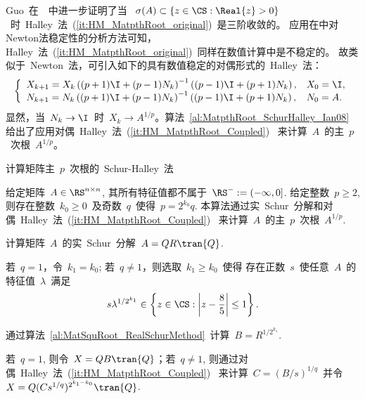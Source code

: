 Guo~在~\cite{Guo2010}~中进一步证明了当 ~$\sigma(A) \subset \{z\in
\CS:
\Real{z}>0\}$~时~Halley~法~(\ref{it:HM_MatpthRoot_original})~是三阶收敛的。
应用在\cite{Iannazzo2006}中对Newton法稳定性的分析方法可知，
Halley~法~(\ref{it:HM_MatpthRoot_original})~同样在数值计算中是不稳定的。
故类似于~Newton~法，可引入如下的具有数值稳定的对偶形式的~Halley~法：
\begin{equation}
\label{it:HM_MatpthRoot_Coupled} \left\{
\begin{array}{ll}
\displaystyle X_{k+1} = X_k\left((p+1)\I + (p-1)N_k\right)^{-1}
\left((p-1)\I + (p+1)N_k\right),
& X_0 = \I, \\
\displaystyle N_{k + 1} = N_k\left((p+1)\I + (p-1)N_k\right)^{-1}
\left((p-1)\I + (p+1)N_k\right), & \displaystyle N_0 = A.
\end{array} \right.
\end{equation}
显然，当~$N_k \to \I$~时~$X_k \to
A^{1/p}$。算法~\ref{al:MatpthRoot_SchurHalley_Ian08}~
给出了应用对偶~Halley~法~(\ref{it:HM_MatpthRoot_Coupled})~
来计算~$A$~的主~$p$~次根~$A^{1/p}$。

\begin{algorithm}[h!]
\caption{计算矩阵主~$p$~次根的~Schur-Halley~法~\cite[算法~
4]{Iannazzo2008}} \label{al:MatpthRoot_SchurHalley_Ian08}
给定矩阵~$A\in\RS^{n\times n}$, 其所有特征值都不属于~$\RS^- :=
(-\infty,0]$. 给定整数~$p\geq 2$, 则存在整数~$k_0 \geq
0$~及奇数~$q$~使得~$p = 2^{k_0}q$.
本算法通过实~Schur~分解和对偶~Halley~法~(\ref{it:HM_MatpthRoot_Coupled})~
来计算~$A$~的主~$p$~次根~$A^{1/p}$.
\begin{list}{.}{
\setlength{\rightmargin}{0em}\setlength{\leftmargin}{1.2em}}
\item
计算矩阵~$A$~的实~Schur~分解~$A = QR\tran{Q}$.
\item
若~$q=1$，令~$k_1 = k_0$; 若~$q\neq1$，则选取~$k_1\geq k_0$~使得
存在正数~$s$~使任意~$A$~的特征值~$\lambda$~满足
$$
s \lambda^{1/{2^{k_1}}} \in \left\{z\in \CS: \left|z -
\frac{8}{5}\right| \leq 1\right\}.
$$
\item
通过算法~\ref{al:MatSquRoot_RealSchurMethod}~计算~$B =
R^{1/{2^{k_1}}}$.
\item
若~$q=1$, 则令~$X = QB\tran{Q}$；若~$q\neq 1$,
则通过对偶~Halley~法~(\ref{it:HM_MatpthRoot_Coupled})~ 来计算~$C =
(B/s)^{1/q}$~并令~$X = Q(Cs^{1/q})^{2^{k_1-k_0}}\tran{Q}$.
\end{list}
\end{algorithm}




